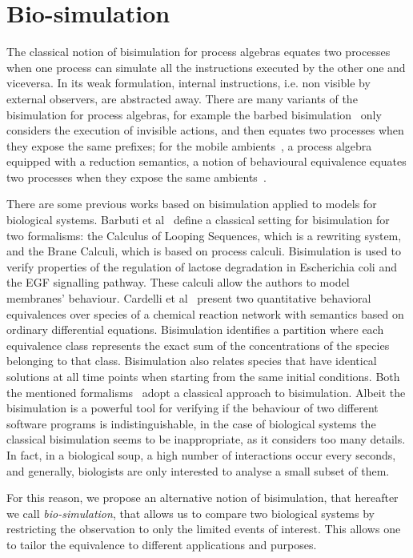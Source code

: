 \section{Bio-simulation}
\label{sec:biosimulation}

The classical notion of bisimulation for process algebras equates two processes
when one process can simulate all the instructions executed by the other one and viceversa.
In its weak formulation, internal instructions, i.e. non visible by external observers,
are abstracted away. 
There are many variants of the bisimulation for process algebras,  for example the
barbed bisimulation~\cite{10.1007/3-540-55719-9_114} only considers the execution of invisible actions, and then equates two processes when they expose the same prefixes; for the mobile ambients~\cite{CardelliG00}, a process algebra equipped with a reduction semantics, a notion of
behavioural equivalence equates two processes when they expose the same ambients~\cite{GC03}. 

There are some previous works based on bisimulation applied to models for biological systems. Barbuti et al~\cite{BMMT08} define a classical setting for bisimulation for two formalisms: the Calculus of Looping Sequences, which is a rewriting system, and the Brane Calculi, which is based on process calculi.
Bisimulation is used to verify properties of the regulation of lactose degradation in
Escherichia coli and the EGF signalling pathway. These calculi allow the authors to model membranes' behaviour.
Cardelli et al~\cite{CTTV15} present two quantitative behavioral equivalences over species of a 
chemical reaction network with semantics based on ordinary differential equations.
Bisimulation identifies a partition where each equivalence class represents the exact sum of the concentrations of the species belonging to that class.
Bisimulation also relates species that have identical solutions at all time points when starting from the same initial conditions.
Both the mentioned formalisms~\cite{BMMT08,CTTV15} adopt a classical approach to bisimulation. 
Albeit the bisimulation is a powerful tool for verifying if the behaviour of two different software 
programs is indistinguishable, in the case of biological systems the classical bisimulation seems to be inappropriate, as it considers too many details.
In fact, in a biological soup, a high number of interactions occur every seconds, and generally, biologists
are only interested to analyse a small subset of them.

For this reason, we propose an alternative notion of bisimulation, that hereafter we call \emph{bio-simulation},
that allows us  to compare two biological systems by restricting the observation to only the limited events of interest.
This allows one to tailor the equivalence to different applications and purposes. 

